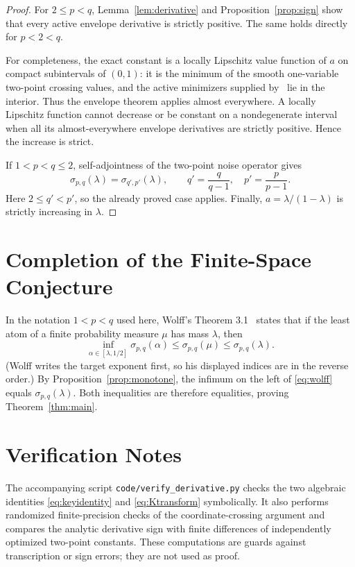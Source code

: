 \documentclass[11pt]{article}
\begin{document}
\begin{proof}
For $2\leq p<q$, Lemma~\ref{lem:derivative} and
Proposition~\ref{prop:sign} show that every active envelope derivative is
strictly positive.  The same holds directly for $p<2<q$.

For completeness, the exact constant is a locally Lipschitz value function
of $a$ on compact subintervals of $(0,1)$: it is the minimum of the smooth
one-variable two-point crossing values, and the active minimizers supplied
by~\cite[Theorem 1.6]{CaoEtAl} lie in the interior.  Thus the envelope theorem
applies almost everywhere.  A locally Lipschitz function cannot decrease or
be constant on a nondegenerate interval when all its almost-everywhere
envelope derivatives are strictly positive.  Hence the increase is strict.

If $1<p<q\leq2$, self-adjointness of the two-point noise operator gives
\[
 \sigma_{p,q}(\lambda)=\sigma_{q',p'}(\lambda),
 \qquad q'=\frac q{q-1},\quad p'=\frac p{p-1}.
\]
Here $2\leq q'<p'$, so the already proved case applies.
Finally, $a=\lambda/(1-\lambda)$ is strictly increasing in $\lambda$.
\end{proof}

\section*{Completion of the Finite-Space Conjecture}

In the notation $1<p<q$ used here, Wolff's Theorem 3.1~\cite{Wolff}
states that if the least atom of a finite probability measure $\mu$ has mass
$\lambda$, then
\begin{equation}\label{eq:wolff}
 \inf_{\alpha\in[\lambda,1/2]}\sigma_{p,q}(\alpha)
 \leq \sigma_{p,q}(\mu)
 \leq \sigma_{p,q}(\lambda).
\end{equation}
(Wolff writes the target exponent first, so his displayed indices are in the
reverse order.)  By Proposition~\ref{prop:monotone}, the infimum on the left
of \eqref{eq:wolff} equals $\sigma_{p,q}(\lambda)$.  Both inequalities are
therefore equalities, proving Theorem~\ref{thm:main}.

\section*{Verification Notes}

The accompanying script \texttt{code/verify\_derivative.py} checks the two
algebraic identities \eqref{eq:keyidentity} and \eqref{eq:Ktransform}
symbolically.  It also performs randomized finite-precision checks of the
coordinate-crossing argument and compares the analytic derivative sign with
finite differences of independently optimized two-point constants.  These
computations are guards against transcription or sign errors; they are not
used as proof.
\end{document}
